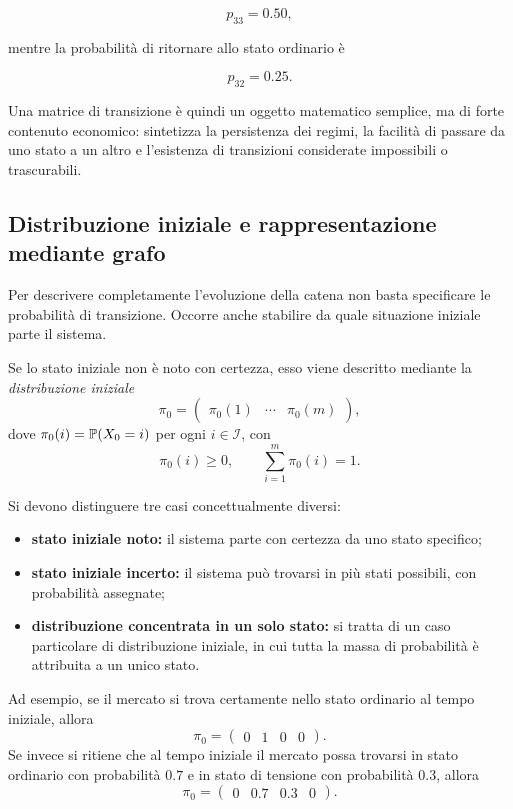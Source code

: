 \[
p_{33}=0.50,
\]

mentre la probabilit\`{a} di ritornare allo stato ordinario \`{e}

\[
p_{32}=0.25.
\]

Una matrice di transizione \`{e} quindi un oggetto matematico semplice,
ma di forte contenuto economico: sintetizza la persistenza dei regimi,
la facilit\`{a} di passare da uno stato a un altro e l'esistenza di
transizioni considerate impossibili o trascurabili.

\subsection{Distribuzione iniziale e rappresentazione mediante grafo}

Per descrivere completamente l'evoluzione della catena non basta
specificare le probabilit\`{a} di transizione. Occorre anche stabilire
da quale situazione iniziale parte il sistema.

Se lo stato iniziale non \`{e} noto con certezza, esso viene descritto
mediante la \emph{distribuzione iniziale}
\[
\pi_0=
\begin{pmatrix}
\pi_0(1) & \cdots & \pi_0(m)
\end{pmatrix},
\]
dove \(\pi_0(i)=\mathbb{P}(X_0=i)\) per ogni \(i\in\mathcal{I}\), con
\[
\pi_0(i)\geq 0,
\qquad
\sum_{i=1}^{m}\pi_0(i)=1.
\]

Si devono distinguere tre casi concettualmente diversi:

\begin{itemize}

\item \textbf{stato iniziale noto:} il sistema parte con certezza da uno
stato specifico;

\item \textbf{stato iniziale incerto:} il sistema pu\`{o} trovarsi in
pi\`{u} stati possibili, con probabilit\`{a} assegnate;

\item \textbf{distribuzione concentrata in un solo stato:} si tratta di
un caso particolare di distribuzione iniziale, in cui tutta la massa di
probabilit\`{a} \`{e} attribuita a un unico stato.

\end{itemize}

Ad esempio, se il mercato si trova certamente nello stato ordinario al
tempo iniziale, allora
\[
\pi_0=
\begin{pmatrix}
0 & 1 & 0 & 0
\end{pmatrix}.
\]
Se invece si ritiene che al tempo iniziale il mercato possa trovarsi in
stato ordinario con probabilit\`{a} \(0.7\) e in stato di tensione con
probabilit\`{a} \(0.3\), allora
\[
\pi_0=
\begin{pmatrix}
0 & 0.7 & 0.3 & 0
\end{pmatrix}.
\]

